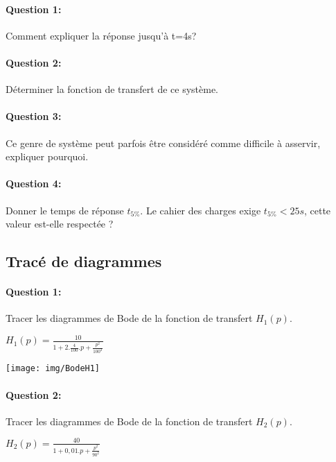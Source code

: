 \paragraph{Question 1:} Comment expliquer la réponse jusqu'à t=4s?

\paragraph{Question 2:} Déterminer la fonction de transfert de ce système.

\paragraph{Question 3:} Ce genre de système peut parfois être considéré comme difficile à asservir, expliquer pourquoi.

\paragraph{Question 4:} Donner le temps de réponse $t_{5\%}$. Le cahier des charges exige $t_{5\%}<25s$, cette valeur est-elle respectée ?

\newpage

\subsection{Tracé de diagrammes}

\paragraph{Question 1:} Tracer les diagrammes de Bode de la fonction de transfert $H_1(p)$.

\begin{center}
$H_1(p)=\frac{10}{1+2.\frac{4}{100}.p+\frac{p^2}{100^2}}$
\end{center}

\begin{center}
 \texttt{[image: img/BodeH1]}
\end{center}

\paragraph{Question 2:} Tracer les diagrammes de Bode de la fonction de transfert $H_2(p)$.

\begin{center}
$H_2(p)=\frac{40}{1+0,01.p+\frac{p^2}{90^2}}$
\end{center}

